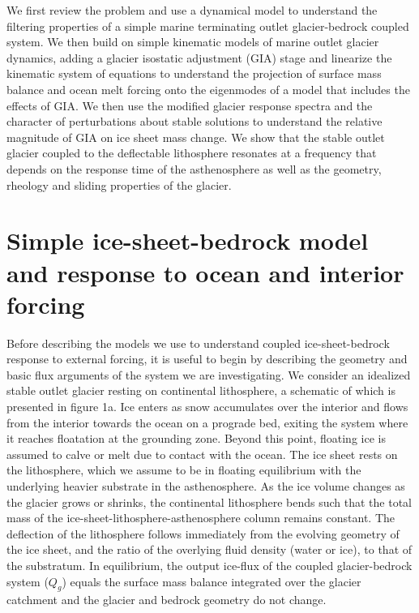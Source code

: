 \documentclass[tc, manuscript]{copernicus}
\begin{document}
We first review the problem and use a dynamical model to understand the filtering properties of a simple marine terminating outlet glacier-bedrock coupled system. We then build on simple kinematic models of marine outlet glacier dynamics, adding a glacier isostatic adjustment (GIA) stage and linearize the kinematic system of equations to understand the projection of surface mass balance and ocean melt forcing onto the eigenmodes of a model that includes the effects of GIA. 
We then use the modified glacier response spectra and the character of perturbations about stable solutions to understand the relative magnitude of GIA on ice sheet mass change.
We show that the stable outlet glacier coupled to the deflectable lithosphere resonates at a frequency that depends on the response time of the asthenosphere as well as the geometry, rheology and sliding properties of the glacier.

\section{Simple ice-sheet-bedrock model and response to ocean and interior forcing}

Before describing the models we use to understand coupled ice-sheet-bedrock response to external forcing, it is useful to begin by describing the geometry and basic flux arguments of the system we are investigating. We consider an idealized stable outlet glacier resting on continental lithosphere, a schematic of which is presented in figure 1a. Ice enters as snow accumulates over the interior and flows from the interior towards the ocean on a prograde bed, exiting the system where it reaches floatation at the grounding zone. Beyond this point, floating ice is assumed to calve or melt due to contact with the ocean. The ice sheet rests on the lithosphere, which we assume to be in floating equilibrium with the underlying heavier substrate in the asthenosphere. As the ice volume changes as the glacier grows or shrinks, the continental lithosphere bends such that the total mass of the ice-sheet-lithosphere-asthenosphere column remains constant. The deflection of the lithosphere follows immediately from the evolving geometry of the ice sheet, and the ratio of the overlying fluid density (water or ice), to that of the substratum. In equilibrium, the output ice-flux of the coupled glacier-bedrock system ($Q_g$) equals the surface mass balance integrated over the glacier catchment and the glacier and bedrock geometry do not change.
\end{document}
